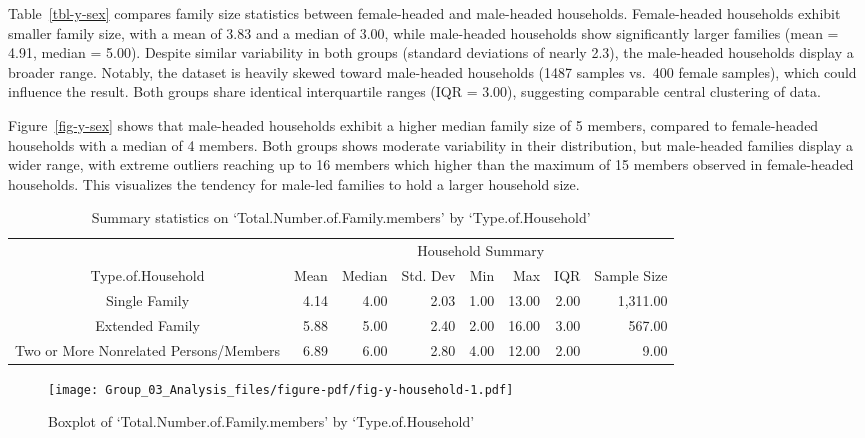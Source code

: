 \documentclass[
]{article}
\begin{document}
Table~\ref{tbl-y-sex} compares family size statistics between
female-headed and male-headed households. Female-headed households
exhibit smaller family size, with a mean of 3.83 and a median of 3.00,
while male-headed households show significantly larger families (mean =
4.91, median = 5.00). Despite similar variability in both groups
(standard deviations of nearly 2.3), the male-headed households display
a broader range. Notably, the dataset is heavily skewed toward
male-headed households (1487 samples vs.~400 female samples), which
could influence the result. Both groups share identical interquartile
ranges (IQR = 3.00), suggesting comparable central clustering of data.

Figure~\ref{fig-y-sex} shows that male-headed households exhibit a
higher median family size of 5 members, compared to female-headed
households with a median of 4 members. Both groups shows moderate
variability in their distribution, but male-headed families display a
wider range, with extreme outliers reaching up to 16 members which
higher than the maximum of 15 members observed in female-headed
households. This visualizes the tendency for male-led families to hold a
larger household size.

\hypertarget{tbl-y-household}{}
\begin{table}
\caption{\label{tbl-y-household}Summary statistics on `Total.Number.of.Family.members' by
`Type.of.Household' }\tabularnewline

\fontsize{9.0pt}{10.8pt}\selectfont
\begin{tabular*}{0.9\linewidth}{@{\extracolsep{\fill}}crrrrrrr}
\toprule
 & \multicolumn{7}{c}{Household Summary} \\ 
\cmidrule(lr){2-8}
Type.of.Household & Mean & Median & Std. Dev & Min & Max & IQR & Sample Size \\ 
\midrule\addlinespace[2.5pt]
Single Family & 4.14 & 4.00 & 2.03 & 1.00 & 13.00 & 2.00 & 1,311.00 \\ 
Extended Family & 5.88 & 5.00 & 2.40 & 2.00 & 16.00 & 3.00 & 567.00 \\ 
Two or More Nonrelated Persons/Members & 6.89 & 6.00 & 2.80 & 4.00 & 12.00 & 2.00 & 9.00 \\ 
\bottomrule
\end{tabular*}
\end{table}

\begin{figure}[H]

{\centering \texttt{[image: Group\_03\_Analysis\_files/figure-pdf/fig-y-household-1.pdf]}

}

\caption{\label{fig-y-household}Boxplot of
`Total.Number.of.Family.members' by `Type.of.Household'}

\end{figure}
\end{document}
